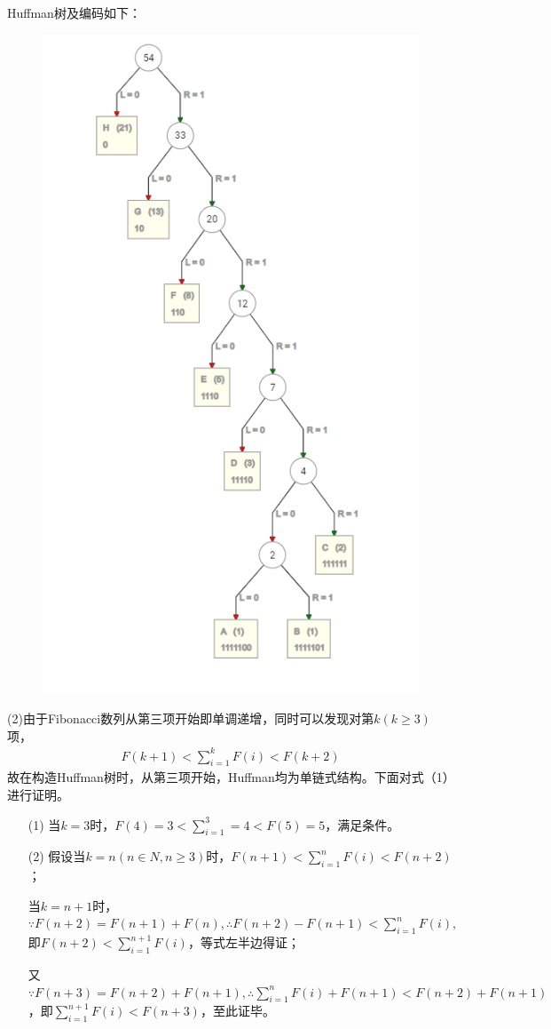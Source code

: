 Huffman树及编码如下：
\begin{figure}[H]
	\centering
	\includegraphics[width=0.5\linewidth]{screenshot036}
	\label{fig:screenshot036}
\end{figure}

(2)由于Fibonacci数列从第三项开始即单调递增，同时可以发现对第$k(k\geq3)$项，
\begin{gather}
	F(k+1) < \sum_{i=1}^{k}F(i) < F(k+2) 
\end{gather}
故在构造Huffman树时，从第三项开始，Huffman均为单链式结构。下面对式（1）进行证明。
\begin{enumerate}
	\item[(1)]当$k=3$时，$F(4)=3<\sum_{i=1}^{3}=4<F(5)=5$，满足条件。
	\item[(2)]假设当$k=n(n\in N ,n\geq 3)$时，$F(n+1) < \sum_{i=1}^{n}F(i) < F(n+2) $；
	
	当$k=n+1$时，$\because F(n+2)=F(n+1)+F(n) ,\therefore F(n+2)-F(n+1)<\sum_{i=1}^{n}F(i),$即$F(n+2)<\sum_{i=1}^{n+1}F(i)$，等式左半边得证；
	
	又$\because F(n+3)=F(n+2)+F(n+1),\therefore\sum_{i=1}^{n}F(i)+F(n+1)<F(n+2)+F(n+1)$，即$\sum_{i=1}^{n+1}F(i)<F(n+3)$，至此证毕。
\end{enumerate}


